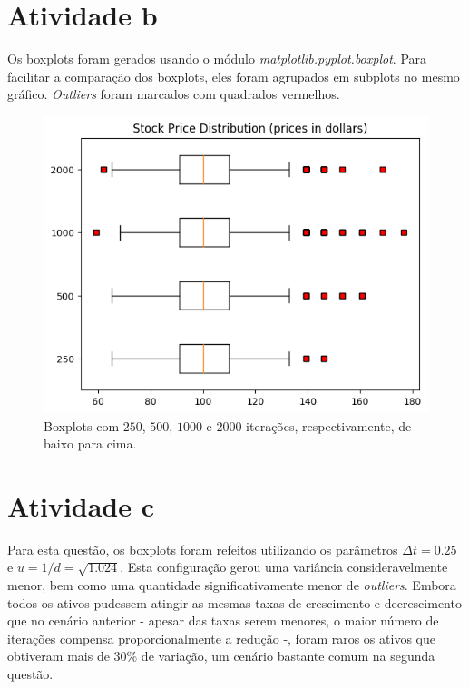 \documentclass{article}
\begin{document}


\section*{Atividade b}

Os boxplots foram gerados usando o módulo \emph{matplotlib.pyplot.boxplot}.
Para facilitar a comparação dos boxplots, eles foram agrupados em subplots no mesmo gráfico.
\emph{Outliers} foram marcados com quadrados vermelhos.

\begin{figure}[H]
	\includegraphics[width=\linewidth]{fig1_250.png}
	\centering
	
	\caption{Boxplots com $250$, $500$, $1000$ e $2000$ iterações, respectivamente, de baixo para cima.}
	\label{}
\end{figure}


\section*{Atividade c}

Para esta questão, os boxplots foram refeitos utilizando os parâmetros $\Delta t = 0.25$ e $u = 1/d = \sqrt{1.024}$.
Esta configuração gerou uma variância consideravelmente menor, bem como uma quantidade significativamente menor de \emph{outliers}.
Embora todos os ativos pudessem atingir as mesmas taxas de crescimento e decrescimento que no cenário anterior - apesar das taxas serem menores, o maior número de iterações compensa proporcionalmente a redução -, foram raros os ativos que obtiveram mais de 30\% de variação, um cenário bastante comum na segunda questão.
\end{document}
